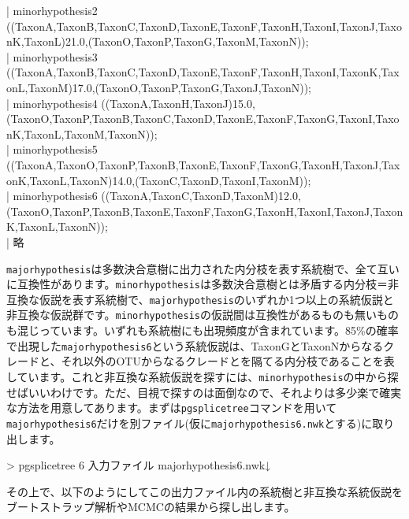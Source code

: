 \documentclass[titlepage,10pt,a4paper]{jsbook}
\newenvironment{content}{\begin{shaded}\vspace{-1em}\raggedright\ttfamily\footnotesize\setlength{\baselineskip}{1.4em}}{\end{shaded}\vspace{-1em}}
\newenvironment{cmd}{\begin{oframed}\raggedright\ttfamily\footnotesize\setlength{\baselineskip}{1.4em}}{\end{oframed}\vspace{-1em}}
\begin{document}
\begin{content}
| {\lbrack}minorhypothesis{\textunderscore}2{\rbrack} ((TaxonA,TaxonB,TaxonC,TaxonD,TaxonE,TaxonF,TaxonH,TaxonI,TaxonJ,TaxonK,TaxonL)21.0,\linebreak(TaxonO,TaxonP,TaxonG,TaxonM,TaxonN));\\
| {\lbrack}minorhypothesis{\textunderscore}3{\rbrack} ((TaxonA,TaxonB,TaxonC,TaxonD,TaxonE,TaxonF,TaxonH,TaxonI,TaxonK,TaxonL,TaxonM)17.0,\linebreak(TaxonO,TaxonP,TaxonG,TaxonJ,TaxonN));\\
| {\lbrack}minorhypothesis{\textunderscore}4{\rbrack} ((TaxonA,TaxonH,TaxonJ)15.0,\linebreak(TaxonO,TaxonP,TaxonB,TaxonC,TaxonD,TaxonE,TaxonF,TaxonG,TaxonI,TaxonK,TaxonL,TaxonM,TaxonN));\\
| {\lbrack}minorhypothesis{\textunderscore}5{\rbrack} ((TaxonA,TaxonO,TaxonP,TaxonB,TaxonE,TaxonF,TaxonG,TaxonH,TaxonJ,TaxonK,TaxonL,TaxonN)14.0,\linebreak(TaxonC,TaxonD,TaxonI,TaxonM));\\
| {\lbrack}minorhypothesis{\textunderscore}6{\rbrack} ((TaxonA,TaxonC,TaxonD,TaxonM)12.0,\linebreak(TaxonO,TaxonP,TaxonB,TaxonE,TaxonF,TaxonG,TaxonH,TaxonI,TaxonJ,TaxonK,TaxonL,TaxonN));\\
| 略
\end{content}
\texttt{majorhypothesis}は多数決合意樹に出力された内分枝を表す系統樹で、全て互いに互換性があります。\texttt{minorhypothesis}は多数決合意樹とは矛盾する内分枝＝非互換な仮説を表す系統樹で、\texttt{majorhypothesis}のいずれか1つ以上の系統仮説と非互換な仮説群です。\texttt{minorhypothesis}の仮説間は互換性があるものも無いものも混じっています。いずれも系統樹にも出現頻度が含まれています。85\%の確率で出現した\texttt{majorhypothesis{\textunderscore}6}という系統仮説は、TaxonGとTaxonNからなるクレードと、それ以外のOTUからなるクレードとを隔てる内分枝であることを表しています。これと非互換な系統仮説を探すには、\texttt{minorhypothesis}の中から探せばいいわけです。ただ、目視で探すのは面倒なので、それよりは多少楽で確実な方法を用意してあります。まずは\texttt{pgsplicetree}コマンドを用いて\texttt{majorhypothesis{\textunderscore}6}だけを別ファイル(仮に\texttt{majorhypothesis{\textunderscore}6.nwk}とする)に取り出します。
\begin{cmd}
{\textgreater} pgsplicetree 6 入力ファイル majorhypothesis{\textunderscore}6.nwk↓
\end{cmd}
その上で、以下のようにしてこの出力ファイル内の系統樹と非互換な系統仮説をブートストラップ解析やMCMCの結果から探し出します。
\end{document}
